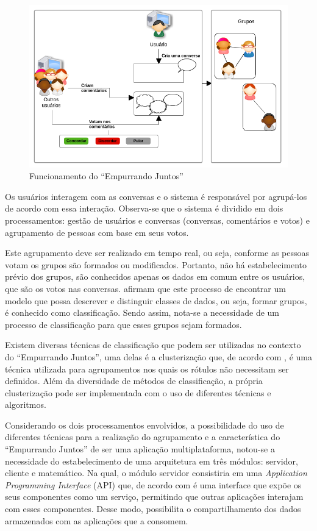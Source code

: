 \begin{figure}[h!]
\centering
\includegraphics[scale=0.6]{figuras/resumo_ej.png}
\caption{Funcionamento do ``Empurrando Juntos''}
\label{fig:resumo_ej}
\end{figure}

Os usuários interagem com as conversas e o sistema é responsável por agrupá-los de acordo com essa interação.
Observa-se que o sistema é dividido em dois processamentos: gestão de usuários 
e conversas (conversas, comentários e votos) e agrupamento de pessoas com base em seus votos. 

Este agrupamento deve ser realizado em tempo real, ou seja, conforme as pessoas votam os grupos são formados ou modificados. 
Portanto, não há estabelecimento prévio dos grupos, são conhecidos apenas os dados em comum entre os usuários, que são os votos nas conversas. 
 afirmam que este processo de encontrar um modelo que possa descrever e 
distinguir classes de dados, ou seja, formar grupos, é conhecido como classificação. Sendo assim, 
nota-se a necessidade de um processo de classificação para que esses grupos sejam formados. 

Existem diversas técnicas de classificação que podem ser utilizadas no contexto do ``Empurrando Juntos'', uma delas é a
clusterização que, de acordo com , é uma técnica utilizada para agrupamentos 
nos quais os rótulos não necessitam ser definidos. Além da diversidade de métodos de classificação, a própria clusterização pode ser implementada com o uso de 
diferentes técnicas e algoritmos. 

Considerando os dois processamentos envolvidos, a possibilidade do uso de diferentes técnicas para a 
realização do agrupamento e a característica do ``Empurrando Juntos'' de ser uma aplicação multiplataforma, notou-se
a necessidade do estabelecimento de uma arquitetura em três módulos: servidor, cliente e matemático. Na qual, o módulo servidor 
consistiria em uma \textit{Application Programming Interface} (API) que, de acordo com 
é uma interface que expõe os seus componentes como um serviço, permitindo que outras aplicações interajam com esses 
componentes. Desse modo, possibilita o compartilhamento dos dados armazenados com as aplicações que a consomem.


